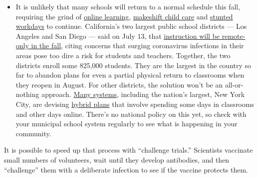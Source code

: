 \begin{itemize}
  \begin{itemize}
  \tightlist
  \item
    It is unlikely that many schools will return to a normal schedule
    this fall, requiring the grind of
    \href{https://www.nytimes3xbfgragh.onion/2020/06/05/us/coronavirus-education-lost-learning.html?action=click\&pgtype=Article\&state=default\&region=MAIN_CONTENT_3\&context=storylines_faq}{online
    learning},
    \href{https://www.nytimes3xbfgragh.onion/2020/05/29/us/coronavirus-child-care-centers.html?action=click\&pgtype=Article\&state=default\&region=MAIN_CONTENT_3\&context=storylines_faq}{makeshift
    child care} and
    \href{https://www.nytimes3xbfgragh.onion/2020/06/03/business/economy/coronavirus-working-women.html?action=click\&pgtype=Article\&state=default\&region=MAIN_CONTENT_3\&context=storylines_faq}{stunted
    workdays} to continue. California's two largest public school
    districts --- Los Angeles and San Diego --- said on July 13, that
    \href{https://www.nytimes3xbfgragh.onion/2020/07/13/us/lausd-san-diego-school-reopening.html?action=click\&pgtype=Article\&state=default\&region=MAIN_CONTENT_3\&context=storylines_faq}{instruction
    will be remote-only in the fall}, citing concerns that surging
    coronavirus infections in their areas pose too dire a risk for
    students and teachers. Together, the two districts enroll some
    825,000 students. They are the largest in the country so far to
    abandon plans for even a partial physical return to classrooms when
    they reopen in August. For other districts, the solution won't be an
    all-or-nothing approach.
    \href{https://bioethics.jhu.edu/research-and-outreach/projects/eschool-initiative/school-policy-tracker/}{Many
    systems}, including the nation's largest, New York City, are
    devising
    \href{https://www.nytimes3xbfgragh.onion/2020/06/26/us/coronavirus-schools-reopen-fall.html?action=click\&pgtype=Article\&state=default\&region=MAIN_CONTENT_3\&context=storylines_faq}{hybrid
    plans} that involve spending some days in classrooms and other days
    online. There's no national policy on this yet, so check with your
    municipal school system regularly to see what is happening in your
    community.
  \end{itemize}
\end{itemize}

It is possible to speed up that process with ``challenge trials.''
Scientists vaccinate small numbers of volunteers, wait until they
develop antibodies, and then ``challenge'' them with a deliberate
infection to see if the vaccine protects them.

